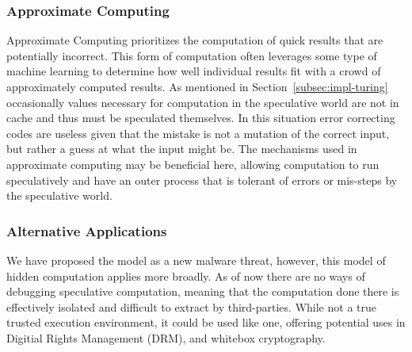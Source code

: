 \subsubsection{Approximate Computing}
Approximate Computing prioritizes the computation of quick results that are
potentially incorrect. This form of computation often leverages some type of
machine learning to determine how well individual results fit with a crowd of
approximately computed results. As mentioned in Section~\ref{subsec:impl-turing}
occasionally values necessary for computation in the speculative world are not
in cache and thus must be speculated themselves. In this situation error
correcting codes are useless given that the mistake is not a mutation of the
correct input, but rather a guess at what the input might be. The mechanisms
used in approximate computing may be beneficial here, allowing computation to
run speculatively and have an outer process that is tolerant of errors or
mis-steps by the speculative world.



\subsubsection{Alternative Applications}
We have proposed the \speculake model as a new malware threat, however, this
model of hidden computation applies more broadly. As of now there are no ways of
debugging speculative computation, meaning that the computation done there is
effectively isolated and difficult to extract by third-parties. While not a true
trusted execution environment, it could be used like one, offering potential
uses in Digitial Rights Management (DRM), and whitebox cryptography.



